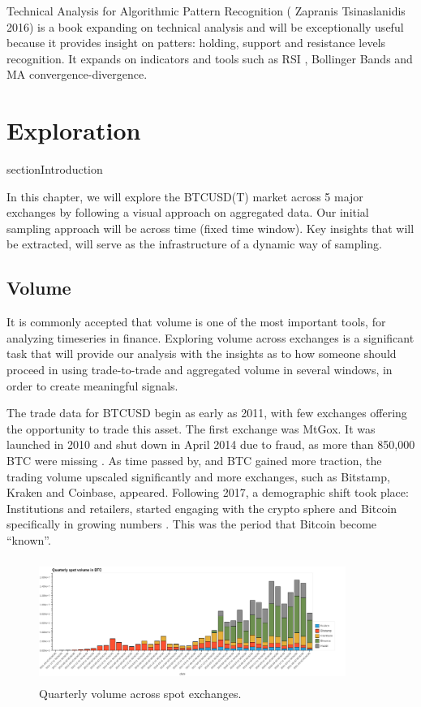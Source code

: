 \documentclass[10pt]{asme2ej}
\begin{document}
Technical Analysis for Algorithmic Pattern Recognition ( Zapranis Tsinaslanidis 2016) is a
book expanding on technical analysis and will be exceptionally useful because it provides insight
on patters: holding, support and resistance levels recognition. It expands on indicators and
tools such as RSI , Bollinger Bands and MA convergence-divergence.


\section{Exploration}

section{Introduction}

In this chapter, we will explore the BTCUSD(T) market across 5 major exchanges by following a visual approach on aggregated data. Our initial sampling approach will be across time (fixed time window). Key insights that will be extracted, will serve as the infrastructure of a dynamic way of sampling. 


\subsection{Volume}

It is commonly accepted that volume is one of the most important tools, for analyzing timeseries in finance. Exploring volume across exchanges is a significant task that will provide our analysis with the insights as to how someone should proceed in using trade-to-trade and aggregated volume in several windows, in order to create meaningful signals.

The trade data for BTCUSD begin as early as 2011, with few exchanges offering the opportunity to trade this asset. The first exchange was MtGox. It was launched in 2010 and shut down in April 2014 due to fraud, as more than 850,000 BTC were missing \cite{wiki_mt}. As time passed by, and BTC gained more traction, the trading volume upscaled significantly and more exchanges, such as Bitstamp, Kraken and Coinbase, appeared. Following 2017, a demographic shift took place: Institutions and retailers, started engaging with the crypto sphere and Bitcoin specifically in growing numbers \cite{med}. This was the period that Bitcoin become “known”.

\begin{figure}[H]
	\centering
	\includegraphics[width=10cm, height = 4cm]{historical_volume.png}
	\caption{Quarterly volume across spot exchanges.}
	\label{fig:hist_vol}
\end{figure}
\end{document}

